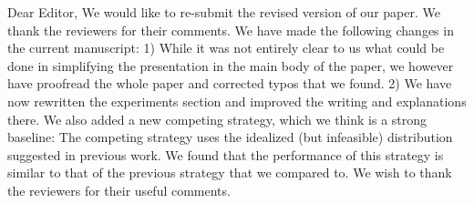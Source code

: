 Dear Editor,
We would like to re-submit the revised version of our paper. We thank the reviewers for their comments. We have made the following changes in the current manuscript:
1) While it was not entirely clear to us what could be done in simplifying the presentation in the main body of the paper, we however have proofread the whole paper and corrected typos that we found.
2) We have now rewritten the experiments section and improved the writing and explanations there.
We also added a new competing strategy, which we think is a strong baseline: The competing strategy uses the idealized
(but infeasible) distribution suggested in previous work. We found that the performance of this strategy is similar to that of the previous strategy that we compared to.
We wish to thank the reviewers for their useful comments. 

